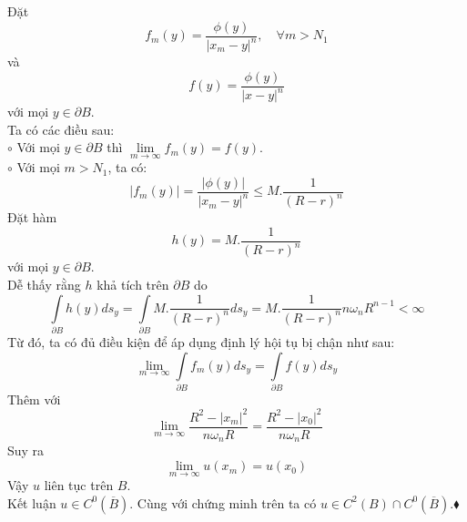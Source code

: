 Đặt
\[
f_m \left( y \right) = \frac{{\phi \left( y \right)}}
{{\left| {x_m  - y} \right|^n }},\quad \forall m > N_1 
\]
và \[
f\left( y \right) = \frac{{\phi \left( y \right)}}
{{\left| {x - y} \right|^n }}
\]
với mọi $
y \in \partial B
$.\\
Ta có các điều sau:\\
$\circ$ Với mọi $
y \in \partial B
$ thì $
\mathop {\lim }\limits_{m \to \infty } f_m \left( y \right) = f\left( y \right)
$.\\
$\circ$ Với mọi $m>{N_1}$, ta có:
\[
\left| {f_m \left( y \right)} \right| = \frac{{\left| {\phi \left( y \right)} \right|}}
{{\left| {x_m  - y} \right|^n }} \leqslant M.\frac{1}
{{\left( {R - r} \right)^n }}
\]
Đặt hàm \[
h\left( y \right) = M.\frac{1}
{{\left( {R - r} \right)^n }}
\]
với mọi $
y \in \partial B
$.\\
Dễ thấy rằng $h$ khả tích trên $\partial B$ do
\[
\int\limits_{\partial B} {h\left( y \right)ds_y }  = \int\limits_{\partial B} {M.\frac{1}
{{\left( {R - r} \right)^n }}ds_y  = M.\frac{1}
{{\left( {R - r} \right)^n }}} n\omega _n R^{n - 1}  < \infty 
\]
Từ đó, ta có đủ điều kiện để áp dụng định lý hội tụ bị chận như sau:
\[
\mathop {\lim }\limits_{m \to \infty } \int\limits_{\partial B} {f_m \left( y \right)ds_y }  = \int\limits_{\partial B} {f\left( y \right)ds_y } 
\]
Thêm với \[
\mathop {\lim }\limits_{m \to \infty } \frac{{R^2  - \left| {x_m } \right|^2 }}
{{n\omega _n R}} = \frac{{R^2  - \left| {x_0 } \right|^2 }}
{{n\omega _n R}}
\]
Suy ra
\[
\mathop {\lim }\limits_{m \to \infty } u\left( {x_m } \right) = u\left( {x_0 } \right)
\]
Vậy $u$ liên tục trên $B$.\\
Kết luận $
u \in C^0 \left( {\overline B } \right)
$. Cùng với chứng minh trên ta có $
u \in C^2 \left( B \right) \cap C^0 \left( {\overline B } \right)
$.$\blacklozenge$
